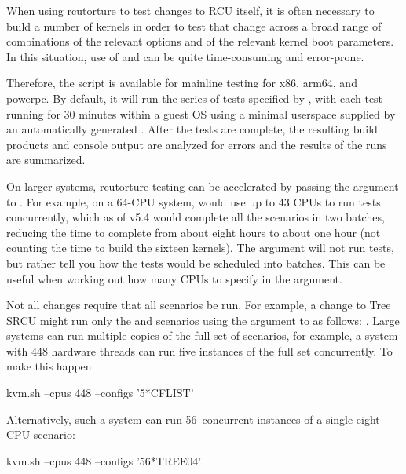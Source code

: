 When using rcutorture to test changes to RCU itself, it is often
necessary to build a number of kernels in order to test that change
across a broad range of combinations of the relevant  options
and of the relevant kernel boot parameters.
In this situation, use
of  and  can be quite time-consuming and error-prone.

Therefore, the 
script is available for mainline testing for x86, arm64, and
powerpc.
By default, it will run the series of tests specified by
, with each test
running for 30 minutes within a guest OS using a minimal userspace
supplied by an automatically generated .
After the tests are
complete, the resulting build products and console output are analyzed
for errors and the results of the runs are summarized.

On larger systems, rcutorture testing can be accelerated by passing the
 argument to .
For example, on a 64-CPU system, 
would use up to 43 CPUs to run tests concurrently, which as of v5.4 would
complete all the scenarios in two batches, reducing the time to complete
from about eight hours to about one hour (not counting the time to build
the sixteen kernels).
The  argument will not run tests,
but rather tell you how the tests would be scheduled into batches.
This
can be useful when working out how many CPUs to specify in the 
argument.

Not all changes require that all scenarios be run.
For example, a change
to Tree SRCU might run only the  and  scenarios using the
 argument to  as follows:
.
Large systems can run multiple copies of the full set of scenarios,
for example, a system with 448 hardware threads can run five instances
of the full set concurrently.
To make this happen:

\begin{VerbatimU}
	kvm.sh --cpus 448 --configs '5*CFLIST'
\end{VerbatimU}

Alternatively, such a system can run 56~concurrent instances of a single
eight-CPU scenario:

\begin{VerbatimU}
	kvm.sh --cpus 448 --configs '56*TREE04'
\end{VerbatimU}

